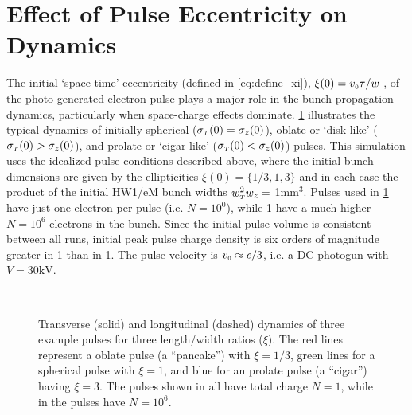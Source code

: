 
\section{Effect of Pulse Eccentricity on Dynamics} \label{sec:initial_shapes}

The initial `space-time' eccentricity (defined in \ref{eq:define_xi}), $\xi ( 0 ) = v_{{\scriptscriptstyle 0}} \tau / w $ , of the photo-generated electron pulse plays a major role in the bunch propagation dynamics, particularly when space-charge effects dominate.
\ref{fig:compare_shape} illustrates the typical dynamics of initially spherical ($ \sigma_{ {\scriptscriptstyle T} }(0) = \sigma_{z} ( 0 ) $), oblate or `disk-like' ($ \sigma_{ {\scriptscriptstyle T} } ( 0 ) > \sigma_{ z } ( 0 ) $), and prolate or `cigar-like' ($ \sigma_{ {\scriptscriptstyle T} } ( 0 ) < \sigma_{ z } ( 0 ) $) pulses.
This simulation uses the idealized pulse conditions described above, where the initial bunch dimensions are given by the ellipticities $ \xi(0) = \{ 1/3 , 1 , 3 \} $ and in each case the product of the initial HW1/eM bunch widths $w_{{\scriptscriptstyle T}}^2 w_z = $ 1mm$^3$.
Pulses used in \ref{fig:compare_shape} have just one electron per pulse (i.e. $ N = 10^{0} $), while \ref{fig:compare_shape} have a much higher $ N = 10^{6} $ electrons in the bunch.
Since the initial pulse volume is consistent between all runs, initial peak pulse charge density is six orders of magnitude greater in \ref{fig:compare_shape} than in \ref{fig:compare_shape}.
The pulse velocity is $ v_{{\scriptscriptstyle 0}} \approx c/3 $, i.e. a DC photogun with $V = 30\text{kV} $.

\begin{figure}
  \centering
  \subfloat[][]{
    \label{fig:compare_shape_N1}
    
  }
  \\
  \subfloat[][]{
    \label{fig:compare_shape_N1e6}
    
  }
  \caption[AG simulation of free-space pulse expansion]{
    Transverse (solid) and longitudinal (dashed) dynamics of three example pulses for three length/width ratios ($\xi$). 
    The red lines represent a oblate pulse (a ``pancake'') with $\xi=1/3$, green lines for a spherical pulse with $\xi=1$, and blue for an prolate pulse (a ``cigar'') having $\xi=3$.
    The pulses shown in  all have total charge $N=1$, while in  the pulses have $N=10^6$.
  }
  \label{fig:compare_shape}
\end{figure}

